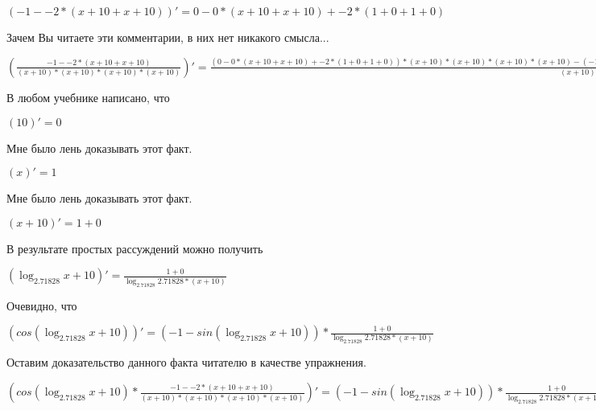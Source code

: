 \documentclass[12pt,a4paper,fleqn]{article}
\theoremstyle{definition}
\begin{document}
$( -1  -  -2  * ( x  +  10  +  x  +  10 ))' =  0  -  0  * ( x  +  10  +  x  +  10 ) +  -2  * ( 1  +  0  +  1  +  0 )$

Зачем Вы читаете эти комментарии, в них нет никакого смысла...

$(\frac{ -1  -  -2  * ( x  +  10  +  x  +  10 )}{( x  +  10 ) * ( x  +  10 ) * ( x  +  10 ) * ( x  +  10 )}
)' = \frac{( 0  -  0  * ( x  +  10  +  x  +  10 ) +  -2  * ( 1  +  0  +  1  +  0 )) * ( x  +  10 ) * ( x  +  10 ) * ( x  +  10 ) * ( x  +  10 ) - ( -1  -  -2  * ( x  +  10  +  x  +  10 )) * ((( 1  +  0 ) * ( x  +  10 ) + ( x  +  10 ) * ( 1  +  0 )) * ( x  +  10 ) * ( x  +  10 ) + ( x  +  10 ) * ( x  +  10 ) * (( 1  +  0 ) * ( x  +  10 ) + ( x  +  10 ) * ( 1  +  0 )))}{( x  +  10 ) * ( x  +  10 ) * ( x  +  10 ) * ( x  +  10 ) * ( x  +  10 ) * ( x  +  10 ) * ( x  +  10 ) * ( x  +  10 )}
$

В любом учебнике написано, что

$( 10 )' =  0 $

Мне было лень доказывать этот факт.

$( x )' =  1 $

Мне было лень доказывать этот факт.

$( x  +  10 )' =  1  +  0 $

В результате простых рассуждений можно получить

$(\log_{ 2.71828 }{ x  +  10 })' = \frac{ 1  +  0 }{\log_{ 2.71828 }{ 2.71828 } * ( x  +  10 )}
$

Очевидно, что

$(cos(\log_{ 2.71828 }{ x  +  10 }))' = ( -1  - sin(\log_{ 2.71828 }{ x  +  10 })) * \frac{ 1  +  0 }{\log_{ 2.71828 }{ 2.71828 } * ( x  +  10 )}
$

Оставим доказательство данного факта читателю в качестве упражнения.

$(cos(\log_{ 2.71828 }{ x  +  10 }) * \frac{ -1  -  -2  * ( x  +  10  +  x  +  10 )}{( x  +  10 ) * ( x  +  10 ) * ( x  +  10 ) * ( x  +  10 )}
)' = ( -1  - sin(\log_{ 2.71828 }{ x  +  10 })) * \frac{ 1  +  0 }{\log_{ 2.71828 }{ 2.71828 } * ( x  +  10 )}
 * \frac{ -1  -  -2  * ( x  +  10  +  x  +  10 )}{( x  +  10 ) * ( x  +  10 ) * ( x  +  10 ) * ( x  +  10 )}
 + cos(\log_{ 2.71828 }{ x  +  10 }) * \frac{( 0  -  0  * ( x  +  10  +  x  +  10 ) +  -2  * ( 1  +  0  +  1  +  0 )) * ( x  +  10 ) * ( x  +  10 ) * ( x  +  10 ) * ( x  +  10 ) - ( -1  -  -2  * ( x  +  10  +  x  +  10 )) * ((( 1  +  0 ) * ( x  +  10 ) + ( x  +  10 ) * ( 1  +  0 )) * ( x  +  10 ) * ( x  +  10 ) + ( x  +  10 ) * ( x  +  10 ) * (( 1  +  0 ) * ( x  +  10 ) + ( x  +  10 ) * ( 1  +  0 )))}{( x  +  10 ) * ( x  +  10 ) * ( x  +  10 ) * ( x  +  10 ) * ( x  +  10 ) * ( x  +  10 ) * ( x  +  10 ) * ( x  +  10 )}
$
\end{document}
